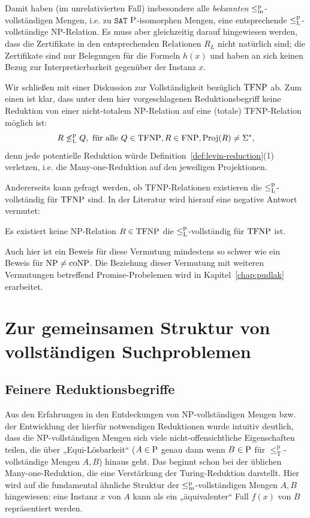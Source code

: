Damit haben (im unrelativierten Fall) insbesondere alle \emph{bekannten} $\leqmp$-vollständigen Mengen, i.e. zu $\mathtt{SAT}$ $\P$-isomorphen Mengen, eine entsprechende $\leqlp$-vollständige NP-Relation.
Es muss aber gleichzeitig darauf hingewiesen werden, dass die Zertifikate in den entsprechenden Relationen $R_L$ nicht natürlich sind; die Zertifikate sind nur Belegungen für die Formeln $h(x)$ und haben an sich keinen Bezug zur Interpretierbarkeit gegenüber der Instanz $x$.

Wir schließen mit einer Diskussion zur Vollständigkeit bezüglich $\TFNP$ ab. Zum einen ist klar, dass unter dem hier vorgeschlagenen Reduktionsbegriff keine Reduktion von einer nicht-totalem NP-Relation auf eine (totale) TFNP-Relation möglich ist: 
\[ R \not\leqlp Q, \text{ für alle } Q\in\TFNP, R\in\FNP, \Proj(R)\neq\Sigma^*, \]
denn jede potentielle Reduktion würde Definition~\ref{def:levin-reduction}(1) verletzen, i.e. die Many-one-Reduktion auf den jeweiligen Projektionen.

Andererseits kann gefragt werden, ob TFNP-Relationen existieren die $\leqlp$-vollständig für $\TFNP$ sind. In der Literatur \parencite[vgl.][]{pudlak_incompleteness_2017} wird hierauf eine negative Antwort vermutet:
\begin{conjecture}[\hTFNP]
    Es existiert keine NP-Relation $R\in\TFNP$ die $\leqlp$-vollständig für $\TFNP$ ist.
\end{conjecture}
Auch hier ist ein Beweis für diese Vermutung mindestens so schwer wie ein Beweis für $\NP\neq\coNP$. Die Beziehung dieser Vermutung mit weiteren Vermutungen betreffend Promise-Probelemen wird in Kapitel~\ref{chap:pudlak} erarbeitet.

\section{Zur gemeinsamen Struktur von vollständigen Suchproblemen}\label{sec:gemeinsame-struktur}

\subsection*{Feinere Reduktionsbegriffe}

Aus den Erfahrungen in den Entdeckungen von NP-vollständigen Mengen bzw. der Entwicklung der hierfür notwendigen Reduktionen wurde intuitiv deutlich, dass die NP-vollständigen Mengen sich viele nicht-offensichtliche Eigenschaften teilen, die über „Equi-Lösbarkeit“ ($A\in \P$ genau dann wenn $B\in \P$ für $\leq_\mathrm T^\mathrm p$-vollständige Mengen $A,B$) hinaus geht.
%
Das beginnt schon bei der üblichen Many-one-Reduktion, die eine Verstärkung der Turing-Reduktion darstellt. Hier wird auf die fundamental ähnliche Struktur der $\leqmp$-vollständigen Mengen $A, B$ hingewiesen: eine Instanz $x$ von $A$ kann als ein „äquivalenter“ Fall $f(x)$ von $B$ repräsentiert werden.

